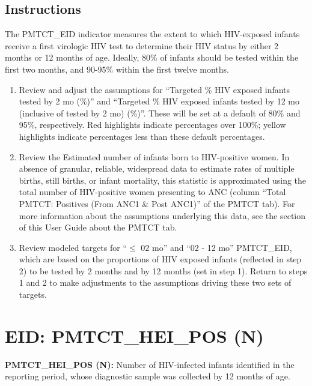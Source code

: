 \documentclass[
  openany]{book}
\begin{document}
\hypertarget{instructions-15}{%
\subsection{Instructions}\label{instructions-15}}

The PMTCT\_EID indicator measures the extent to which HIV-exposed infants
receive a first virologic HIV test to determine their HIV status by
either 2 months or 12 months of age. Ideally, 80\% of infants should be
tested within the first two months, and 90-95\% within the first twelve
months.

\begin{enumerate}
\def\labelenumi{\arabic{enumi}.}
\item
  Review and adjust the assumptions for ``Targeted \% HIV exposed
  infants tested by 2 mo (\%)'' and ``Targeted \% HIV exposed infants
  tested by 12 mo (inclusive of tested by 2 mo) (\%)''. These will be
  set at a default of 80\% and 95\%, respectively. Red highlights
  indicate percentages over 100\%; yellow highlights indicate
  percentages less than these default percentages.
\item
  Review the Estimated number of infants born to HIV-positive women.
  In absence of granular, reliable, widespread data to estimate rates
  of multiple births, still births, or infant mortality, this
  statistic is approximated using the total number of HIV-positive
  women presenting to ANC (column ``Total PMTCT: Positives (From ANC1 \&
  Post ANC1)'' of the PMTCT tab). For more information about the
  assumptions underlying this data, see the section of this User Guide
  about the PMTCT tab.
\item
  Review modeled targets for ``\(\leq\) 02 mo'' and ``02 - 12 mo'' PMTCT\_EID,
  which are based on the proportions of HIV exposed infants (reflected
  in step 2) to be tested by 2 months and by 12 months (set in step
  1). Return to steps 1 and 2 to make adjustments to the assumptions
  driving these two sets of targets.
\end{enumerate}

\hypertarget{eid-pmtct_hei_pos-n}{%
\section{EID: PMTCT\_HEI\_POS (N)}\label{eid-pmtct_hei_pos-n}}

\textbf{PMTCT\_HEI\_POS (N):} Number of HIV-infected infants identified in the
reporting period, whose diagnostic sample was collected by 12 months of
age.
\end{document}
